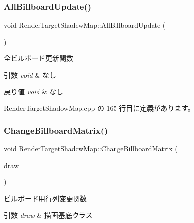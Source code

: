\subsubsection{\texorpdfstring{All\+Billboard\+Update()}{AllBillboardUpdate()}}
{\footnotesize\ttfamily void Render\+Target\+Shadow\+Map\+::\+All\+Billboard\+Update (\begin{DoxyParamCaption}{ }\end{DoxyParamCaption})\hspace{0.3cm}{\ttfamily [private]}}



全ビルボード更新関数 


\begin{DoxyParams}{引数}
{\em void} & なし \\
\hline
\end{DoxyParams}

\begin{DoxyRetVals}{戻り値}
{\em void} & なし \\
\hline
\end{DoxyRetVals}


 Render\+Target\+Shadow\+Map.\+cpp の 165 行目に定義があります。

\mbox{\label{class_render_target_shadow_map_aad78575f0b78dad8e3bacc00d43cce8f}} 
\subsubsection{\texorpdfstring{Change\+Billboard\+Matrix()}{ChangeBillboardMatrix()}}
{\footnotesize\ttfamily void Render\+Target\+Shadow\+Map\+::\+Change\+Billboard\+Matrix (\begin{DoxyParamCaption}\item[{\mbox{\hyperlink{class_draw_base}{Draw\+Base}} $\ast$}]{draw }\end{DoxyParamCaption})\hspace{0.3cm}{\ttfamily [private]}}



ビルボード用行列変更関数 


\begin{DoxyParams}{引数}
{\em draw} & 描画基底クラス \\
\hline
\end{DoxyParams}

